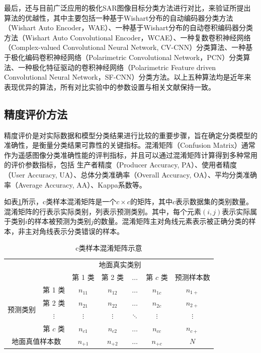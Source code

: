 最后，还与目前广泛应用的极化SAR图像目标分类方法进行对比，来验证所提出算法的优越性，其中主要包括一种基于Wishart分布的自动编码器分类方法（Wishart Auto Encoder，WAE）、一种基于Wishart分布的自动卷积编码器分类方法（Wishart Auto Convolutional Encoder，WCAE）、一种复数卷积神经网络（Complex-valued Convolutional Neural Network, CV-CNN）分类算法、一种基于极化编码卷积神经网络（Polarimetric Convolutional Network，PCN）分类算法、一种极化特征驱动的卷积神经网络（Polarimetric Feature driven Convolutional Neural Network，SF-CNN）分类方法。以上五种算法均是近年来表现优异的算法，所有对比实验中的参数设置与相关文献保持一致。

\subsection{精度评价方法}
精度评价是对实际数据和模型分类结果进行比较的重要步骤，旨在确定分类模型的准确性，是衡量分类结果可靠性的关键指标。混淆矩阵（Confusion Matrix）通常作为遥感图像分类准确性能的评判指标，并且可以通过混淆矩阵计算得到多种常用的评价参数指标，包括
生产者精度（Producer Accuracy, PA）、使用者精度（User Accuracy, UA）、总体分类准确率（Overall Accuracy, OA）、平均分类准确率（Average Accuracy, AA）、Kappa系数等。

如表\ref{tab:conf_示意表}所示，c类样本混淆矩阵是一个$c \times c$的矩阵，其中$c$表示数据集的类别数量。混淆矩阵的行表示实际类别，列表示预测类别。其中，每个元素$(i, j)$表示实际属于类别$i$的样本被预测为类别$j$的数量。混淆矩阵主对角线元素表示被正确分类的样本，非主对角线表示分类错误的样本。

\begin{table}[ht!]
    \caption{c类样本混淆矩阵示意}
    \label{tab:conf_示意表}
    \centering
    \begin{tabular}{ccccccc}
        \hline
                                    &          & \multicolumn{4}{c}{地面真实类别} &                                           \\
        \cline{3-6}
                                    &          & 第 1 类                      & 第 2 类    & $\ldots$ & 第 $c$ 类  & 预测样本数    \\
        \multirow{4}{*}{预测类别}       & 第 1 类    & $n_{11}$                   & $n_{12}$ & $\ldots$ & $n_{1c}$ & $n_{1+}$ \\
                                    & 第 2 类    & $n_{21}$                   & $n_{22}$ & $\ldots$ & $n_{2c}$ & $n_{2+}$ \\
                                    & $\vdots$ & $\vdots$                   & $\vdots$ & $\ddots$ & $\vdots$ & $\vdots$ \\
                                    & 第 $c$ 类  & $n_{c1}$                   & $n_{c2}$ & $\ldots$ & $n_{cc}$ & $n_{c+}$ \\
        \multicolumn{2}{c}{地面真值样本数} & $n_{+1}$ & $n_{+2}$                   & $\ldots$ & $n_{+c}$ & $N$                 \\
        \hline
    \end{tabular}
\end{table}

